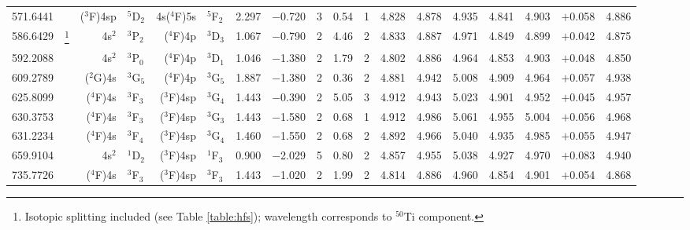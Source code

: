 \documentclass[traditabstract]{aa}
\newcommand{\pst}{\phantom{*}}
\begin{document}
\begin{center}
\begin{mpsupertabular}{r@{}c@{\ \ \ }r@{~}l@{\ }r@{~}l@{\ \ \ }c@{\ \ \ }c@{\ \ \ }c@{\ \ \ }c@{\ \ \ }c@{\ \ \ }c@{\ \ \ }c@{\ \ \ }c@{\ \ \ }c@{\ \ \ }c@{\ \ \ }r@{\ \ \ }c}
571.6441 & & \footnotesize ($^3$F)4sp&\footnotesize$^5$D$_2$             &\footnotesize4s($^4$F)5s&\footnotesize$^5$F$_2$             & 2.297 & $-$0.720 & 3  & 0.54 & 1\pst      & 4.828 & 4.878 & 4.935 & 4.841 & 4.903 & $+$0.058    & 4.886 \\
586.6429 & \footnote[1]{Isotopic splitting included (see Table \protect\ref{table:hfs}); wavelength corresponds to $^{50}$Ti component.\protect\label{Tiisonote}}		     	             	                                       
           & \footnotesize 4s$^2$    &\footnotesize$^3$P$_2$             &\footnotesize($^4$F)4p  &\footnotesize$^3$D$_3$             & 1.067 & $-$0.790 & 2  & 4.46 & 2\pst      & 4.833 & 4.887 & 4.971 & 4.849 & 4.899 & $+$0.042    & 4.875 \\
592.2088 & \color{BrickRed}{$^a$}																							                       
           & \footnotesize 4s$^2$    &\footnotesize$^3$P$_0$             &\footnotesize($^4$F)4p  &\footnotesize$^3$D$_1$             & 1.046 & $-$1.380 & 2  & 1.79 & 2\pst      & 4.802 & 4.886 & 4.964 & 4.853 & 4.903 & $+$0.048    & 4.850 \\
609.2789 & & \footnotesize ($^2$G)4s &\footnotesize$^3$G$_5$             &\footnotesize($^4$F)4p  &\footnotesize$^3$G$_5$             & 1.887 & $-$1.380 & 2  & 0.36 & 2\pst      & 4.881 & 4.942 & 5.008 & 4.909 & 4.964 & $+$0.057    & 4.938 \\
625.8099 & & \footnotesize ($^4$F)4s &\footnotesize$^3$F$_3$             &\footnotesize($^3$F)4sp &\footnotesize$^3$G$_4$             & 1.443 & $-$0.390 & 2  & 5.05 & 3\pst      & 4.912 & 4.943 & 5.023 & 4.901 & 4.952 & $+$0.045    & 4.957 \\
630.3753 & & \footnotesize ($^4$F)4s &\footnotesize$^3$F$_3$             &\footnotesize($^3$F)4sp &\footnotesize$^3$G$_3$             & 1.443 & $-$1.580 & 2  & 0.68 & 1\pst      & 4.912 & 4.986 & 5.061 & 4.955 & 5.004 & $+$0.056    & 4.968 \\
631.2234 & & \footnotesize ($^4$F)4s &\footnotesize$^3$F$_4$             &\footnotesize($^3$F)4sp &\footnotesize$^3$G$_4$             & 1.460 & $-$1.550 & 2  & 0.68 & 2\pst      & 4.892 & 4.966 & 5.040 & 4.935 & 4.985 & $+$0.055    & 4.947 \\
659.9104 & & \footnotesize 4s$^2$    &\footnotesize$^1$D$_2$             &\footnotesize($^3$F)4sp &\footnotesize$^1$F$_3$             & 0.900 & $-$2.029 & 5  & 0.80 & 2\pst      & 4.857 & 4.955 & 5.038 & 4.927 & 4.970 & $+$0.083    & 4.940 \\
735.7726 & & \footnotesize ($^4$F)4s &\footnotesize$^3$F$_3$             &\footnotesize($^3$F)4sp &\footnotesize$^3$F$_3$             & 1.443 & $-$1.020 & 2  & 1.99 & 2\pst      & 4.814 & 4.886 & 4.960 & 4.854 & 4.901 & $+$0.054    & 4.868 \\

\end{mpsupertabular}
\end{center}
\end{document}

